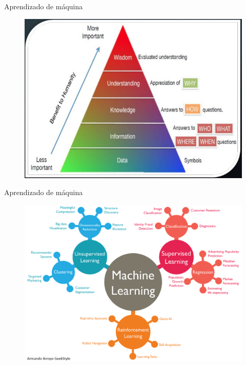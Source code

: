 \documentclass[t]{beamer}
\begin{document}
\begin{frame}{Aprendizado de máquina}
\begin{figure}
	\includegraphics[width=\linewidth]{beneficiosdaanalisedosdados}
\end{figure}
\end{frame}

\begin{frame}{Aprendizado de máquina}
\begin{figure}
	\includegraphics[width=\linewidth]{machinelearning}
\end{figure}
\end{frame}
\end{document}
